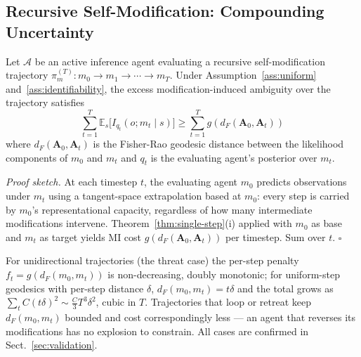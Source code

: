\documentclass[runningheads]{llncs}
\begin{document}
\subsection{Recursive Self-Modification: Compounding Uncertainty}

\begin{theorem}
\label{thm:recursive}
Let $\mathcal{A}$ be an active inference agent evaluating a recursive self-modification trajectory $\pi_m^{(T)}: m_0 \to m_1 \to \cdots \to m_T$. Under Assumption~\ref{ass:uniform} and~\ref{ass:identifiability}, the excess modification-induced ambiguity over the trajectory satisfies
\begin{equation}
\sum_{t=1}^{T} \mathbb{E}_s\bigl[I_{q_t}(o; m_t \mid s)\bigr] \geq \sum_{t=1}^{T} g(d_F(\mathbf{A}_0, \mathbf{A}_t))
\end{equation}
where $d_F(\mathbf{A}_0, \mathbf{A}_t)$ is the Fisher-Rao geodesic distance between the likelihood components of $m_0$ and $m_t$ and $q_t$ is the evaluating agent's posterior over $m_t$.
\end{theorem}

\emph{Proof sketch.} At each timestep $t$, the evaluating agent $m_0$ predicts observations under $m_t$ using a tangent-space extrapolation based at $m_0$: every step is carried by $m_0$'s representational capacity, regardless of how many intermediate modifications intervene. Theorem~\ref{thm:single-step}(i) applied with $m_0$ as base and $m_t$ as target yields MI cost $g(d_F(\mathbf{A}_0, \mathbf{A}_t))$ per timestep. Sum over $t$. $\square$

\begin{remark}
\label{rem:compounding}
For unidirectional trajectories (the threat case) the per-step penalty $f_t = g(d_F(m_0, m_t))$ is non-decreasing, doubly monotonic; for uniform-step geodesics with per-step distance $\delta$, $d_F(m_0, m_t) = t\delta$ and the total grows as $\sum_t C(t\delta)^2 \sim \tfrac{C}{3} T^3 \delta^2$, cubic in $T$. Trajectories that loop or retreat keep $d_F(m_0, m_t)$ bounded and cost correspondingly less --- an agent that reverses its modifications has no explosion to constrain. All cases are confirmed in Sect.~\ref{sec:validation}.
\end{remark}
\end{document}
